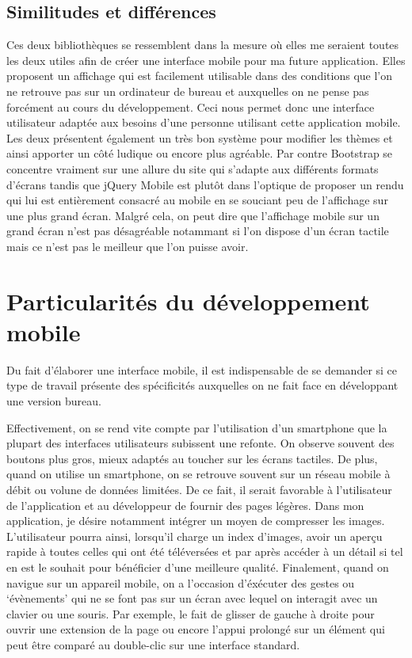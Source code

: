 \documentclass[letterpaper,10pt,french]{sphinxmanual}
\begin{document}
\section{Similitudes et différences}
\label{Diff_xe9rence_jQM_boot:similitudes-et-differences}
Ces deux bibliothèques se ressemblent dans la mesure où elles me seraient toutes
les deux utiles afin de créer une interface mobile pour ma future application.
Elles proposent un affichage qui est facilement utilisable dans des conditions
que l'on ne retrouve pas sur un ordinateur de bureau et auxquelles on ne pense pas
forcément au cours du développement. Ceci nous permet donc une interface utilisateur
adaptée aux besoins d'une personne utilisant cette application mobile. Les deux
présentent également un très bon système pour modifier les thèmes et ainsi
apporter un côté ludique ou encore plus agréable.
Par contre Bootstrap se concentre vraiment sur une allure du site qui s'adapte
aux différents formats d'écrans tandis que jQuery Mobile est plutôt dans l'optique
de proposer un rendu qui lui est entièrement consacré au mobile en se souciant peu
de l'affichage sur une plus grand écran. Malgré cela, on peut dire que l'affichage
mobile sur un grand écran n'est pas désagréable notammant si l'on dispose d'un écran
tactile mais ce n'est pas le meilleur que l'on puisse avoir.


\chapter{Particularités du développement mobile}
\label{Particularit_xe9s::doc}\label{Particularit_xe9s:particularites-du-developpement-mobile}
Du fait d'élaborer une interface mobile, il est indispensable  de se demander
si ce type de travail présente des spécificités auxquelles on ne fait face en
développant une version bureau.

Effectivement, on se rend vite compte par l'utilisation d'un smartphone que la
plupart des interfaces utilisateurs subissent une refonte. On observe souvent
des boutons plus gros, mieux adaptés au toucher sur les écrans tactiles.
De plus, quand on utilise un smartphone, on se retrouve souvent sur un réseau
mobile à débit ou volune de données limitées. De ce fait, il serait favorable à
l'utilisateur de l'application et au développeur de fournir des pages légères.
Dans mon application, je désire notamment intégrer un moyen de compresser les
images. L'utilisateur pourra ainsi, lorsqu'il charge un index d'images, avoir
un aperçu rapide à toutes celles qui ont été téléversées et par après accéder
à un détail si tel en est le souhait pour bénéficier d'une meilleure qualité.
Finalement, quand on navigue sur un appareil mobile, on a l'occasion d'éxécuter
des gestes ou `évènements' qui ne se font pas sur un écran avec lequel on interagit
avec un clavier ou une souris. Par exemple, le fait de glisser de gauche à droite
pour ouvrir une extension de la page ou encore l'appui prolongé sur un élément
qui peut être comparé au double-clic sur une interface standard.
\end{document}
